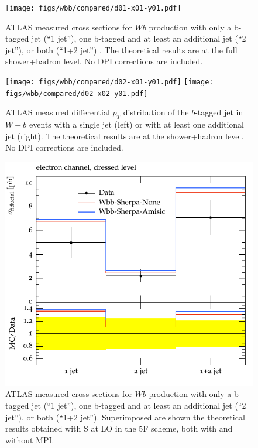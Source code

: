\documentclass[11pt]{cernrep}
\newcommand{\Sherpa}{S\protect\scalebox{0.8}{HERPA}\xspace}
\newcommand{\pt}{\ensuremath{p_{T}}\xspace}
\begin{document}
\begin{figure}[htbp]
\begin{center}
   \texttt{[image: figs/wbb/compared/d01-x01-y01.pdf]}
\end{center}
\caption{ATLAS measured cross sections for $Wb$ production with only a
  b-tagged jet (``1 jet''), one b-tagged and at least an additional
  jet (``2 jet''), or both (``1+2 jet'') .  The theoretical results
  are at the full shower+hadron level. No DPI corrections are
  included. }
\label{fig:wbb-njet}
\end{figure}
\begin{figure}[htbp]
\begin{center}
   \texttt{[image: figs/wbb/compared/d02-x01-y01.pdf]}
   \texttt{[image: figs/wbb/compared/d02-x02-y01.pdf]}
\end{center}
\caption{ATLAS measured differential \pt distribution of the
  $b$-tagged jet in $W+b$ events with a single jet (left) or with at
  least one additional jet (right). The theoretical results are at the
  shower+hadron level. No DPI corrections are included.}
\label{fig:wbb-pt}
\end{figure}


\begin{figure}[htbp]
\begin{center}
   \includegraphics[scale=0.65]{figs/wbb/sherpa/d01-x01-y02.pdf}
\end{center}
\caption{ATLAS measured cross sections for $Wb$ production with only a b-tagged jet (``1
  jet''), one b-tagged and at least an additional jet (``2 jet''), or both (``1+2 jet'').
  Superimposed are shown the theoretical results obtained with \Sherpa
  at LO in the 5F scheme, both with and without MPI.} 
\label{fig:wbb-njet-sherpa}
\end{figure}
\end{document}
